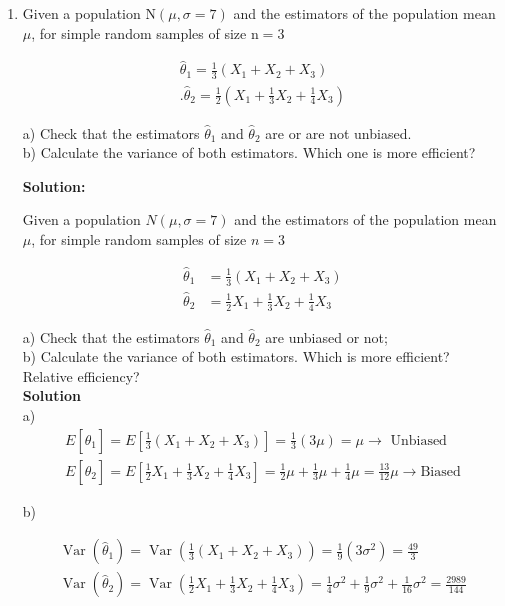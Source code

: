 \documentclass[12pt]{article}
\begin{document}
\begin{enumerate}
\item Given a population $\mathrm{N}(\mu, \sigma=7)$ and the estimators of the population mean $\mu$, for simple random samples of size $\mathrm{n}=3$

$$
\begin{gathered}
\hat{\theta}_1=\frac{1}{3}\left(X_1+X_2+X_3\right) \\
.\hat{\theta}_2=\frac{1}{2} (X_1+\frac{1}{3} X_2+\frac{1}{4} X_3)
\end{gathered}
$$

a) Check that the estimators $\widehat{\theta}_1$ and $\widehat{\theta}_2$ are or are not unbiased.\\
b) Calculate the variance of both estimators. Which one is more efficient? 

{\color{blue}
\noindent \textbf{Solution:}

Given a population $N(\mu, \sigma=7)$ and the estimators of the population mean $\mu$, for simple random samples of size $n=3$

$$
\begin{aligned}
	\hat{\theta}_{1} & =\frac{1}{3}\left(X_{1}+X_{2}+X_{3}\right) \\
	\hat{\theta}_{2} & =\frac{1}{2} X_{1}+\frac{1}{3} X_{2}+\frac{1}{4} X_{3}
\end{aligned}
$$

\noindent a) Check that the estimators $\hat{\theta}_{1}$ and $\hat{\theta}_{2}$ are unbiased or not;\\

\noindent b) Calculate the variance of both estimators. Which is more efficient? Relative efficiency?\\

\noindent \textbf{Solution}\\

\noindent a) 
$$
\begin{gathered}
	E\left[\hat{\theta}_{1}\right]=E\left[\frac{1}{3}\left(X_{1}+X_{2}+X_{3}\right) \right]=\frac{1}{3}(3 \mu)=\mu \rightarrow \text { Unbiased } \\
	E\left[\hat{\theta}_{2}\right]=E\left[\frac{1}{2} X_{1}+\frac{1}{3} X_{2}+\frac {1}{4} X_{3}\right]=\frac{1}{2} \mu+\frac{1}{3} \mu+\frac{1}{4} \mu=\frac{13} {12} \mu \rightarrow \text {Biased} 
\end{gathered}
$$

\noindent b)

$$
\begin{gathered}
	\operatorname{Var}\left(\hat{\theta}_{1}\right)=\operatorname{Var}\left(\frac{1}{3}\left(X_{1}+X_{2} +X_{3}\right)\right)=\frac{1}{9}\left(3 \sigma^{2}\right)=\frac{49}{3} \\
	\operatorname{Var}\left(\hat{\theta}_{2}\right)=\operatorname{Var}\left(\frac{1}{2} X_{1}+\frac{1}{3 } X_{2}+\frac{1}{4} X_{3}\right)=\frac{1}{4} \sigma^{2}+\frac{1}{9} \sigma^{2 }+\frac{1}{16}\sigma^{2}=\frac{2989}{144}
\end{gathered}
$$

}
\end{enumerate}
\end{document}

